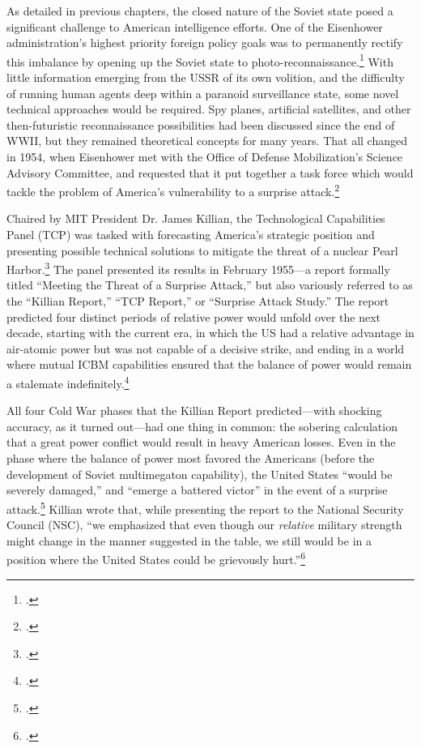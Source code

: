 \documentclass[11pt]{memoir}
\begin{document}
As detailed in previous chapters, the closed nature of the Soviet state posed a significant challenge to American intelligence efforts. One of the Eisenhower administration's highest priority foreign policy goals was to permanently rectify this imbalance by opening up the Soviet state to photo-reconnaissance.\footcite[p.~65]{hayes_struggling_1994} With little information emerging from the USSR of its own volition, and the difficulty of running human agents deep within a paranoid surveillance state, some novel technical approaches would be required. Spy planes, artificial satellites, and other then-futuristic reconnaissance possibilities had been discussed since the end of WWII, but they remained theoretical concepts for many years. That all changed in 1954, when Eisenhower met with the Office of Defense Mobilization's Science Advisory Committee, and requested that it put together a task force which would tackle the problem of America's vulnerability to a surprise attack.\footcite[p.~67. The president's science advisor described this moment as the starting point for ``any complete account of how science advice was mobilized for the use of President Eisenhower.'']{killian_sputnik_1977}

Chaired by MIT President Dr. James Killian, the Technological Capabilities Panel (TCP) was tasked with forecasting America's strategic position and presenting possible technical solutions to mitigate the threat of a nuclear Pearl Harbor.\footcite[p.~115]{mcdougall_heavens_1985} The panel presented its results in February 1955---a report formally titled ``Meeting the Threat of a Surprise Attack,'' but also variously referred to as the ``Killian Report,'' ``TCP Report,'' or ``Surprise Attack Study.'' The report predicted four distinct periods of relative power would unfold over the next decade, starting with the current era, in which the US had a relative advantage in air-atomic power but was not capable of a decisive strike, and ending in a world where mutual ICBM capabilities ensured that the balance of power would remain a stalemate indefinitely.\footcite[p.~116]{mcdougall_heavens_1985}

All four Cold War phases that the Killian Report predicted---with shocking accuracy, as it turned out---had one thing in common: the sobering calculation that a great power conflict would result in heavy American losses. Even in the phase where the balance of power most favored the Americans (before the development of Soviet multimegaton capability), the United States ``would be severely damaged,'' and ``emerge a battered victor'' in the event of a surprise attack.\footcite{technological_capabilities_panel_meeting_1955} Killian wrote that, while presenting the report to the National Security Council (NSC), ``we emphasized that even though our \emph{relative} military strength might change in the manner suggested in the table, we still would be in a position where the United States could be grievously hurt.''\footcite[p.~75]{killian_sputnik_1977}
\end{document}
